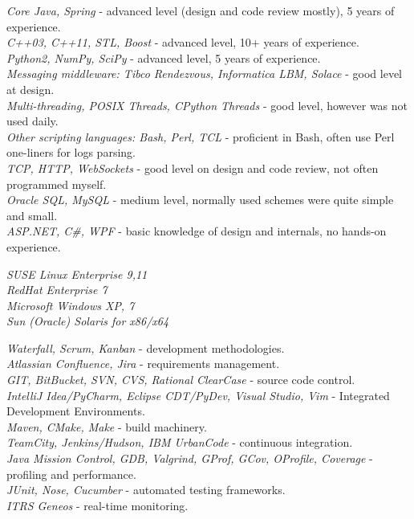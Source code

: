 \documentclass[10pt]{article} %
\begin{document}
{
\textit{Core Java, Spring} - advanced level (design and code review mostly), 5 years of experience.\\
\textit{C++03, C++11, STL, Boost} - advanced level, 10+ years of experience.\\
\textit{Python2, NumPy, SciPy} - advanced level, 5 years of experience.\\
\textit{Messaging middleware: Tibco Rendezvous, Informatica LBM, Solace} - good level at design.\\
\textit{Multi-threading, POSIX Threads, CPython Threads} - good level, however was not used daily.\\
\textit{Other scripting languages: Bash, Perl, TCL} -  proficient in Bash, often use Perl one-liners for logs parsing.\\
\textit{TCP, HTTP, WebSockets} - good level on design and code review, not often programmed myself.\\
\textit{Oracle SQL, MySQL} - medium level, normally used schemes were quite simple and small.\\
\textit{ASP.NET, C\#, WPF} - basic knowledge of design and internals, no hands-on experience.\\
}


{
\textit{SUSE Linux Enterprise 9,11}\\
\textit{RedHat Enterprise 7}\\
\textit{Microsoft Windows XP, 7}\\
\textit{Sun (Oracle) Solaris for x86/x64}
}


\clearpage

{
\textit{Waterfall, Scrum, Kanban} - development methodologies.\\
\textit{Atlassian Confluence, Jira} - requirements management.\\
\textit{GIT, BitBucket, SVN, CVS, Rational ClearCase} - source code control.\\
\textit{IntelliJ Idea/PyCharm, Eclipse CDT/PyDev, Visual Studio, Vim} - Integrated Development Environments.\\
\textit{Maven, CMake, Make} - build machinery.\\
\textit{TeamCity, Jenkins/Hudson, IBM UrbanCode} - continuous integration.\\
\textit{Java Mission Control, GDB, Valgrind, GProf, GCov, OProfile, Coverage} - profiling and performance.\\ 
\textit{JUnit, Nose, Cucumber} - automated testing frameworks.\\
\textit{ITRS Geneos} - real-time monitoring.\\
}
\end{document}

